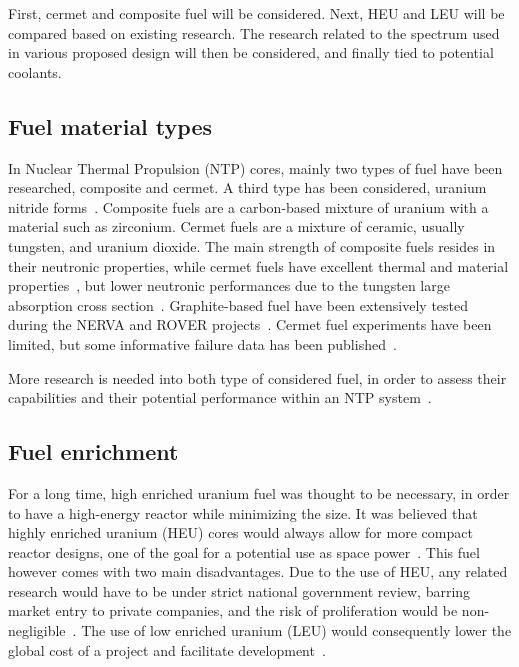 \documentclass[IJPHM, 2017, 29]{PHMSociety}
\begin{document}
First, cermet and composite fuel will be considered. Next, HEU and LEU will be compared based on existing research. The research related to the spectrum used in various proposed design will then be considered, and finally tied to potential coolants.

\subsection{Fuel material types}

In Nuclear Thermal Propulsion (NTP) cores, mainly two types of fuel have been researched, composite and cermet. A third type has been considered, uranium nitride forms~\citep{matthews1993fuels}. Composite fuels are a carbon-based mixture of uranium with a material such as zirconium. Cermet fuels are a mixture of ceramic, usually tungsten, and uranium dioxide. The main strength of composite fuels resides in their neutronic properties, while cermet fuels have excellent thermal and material properties~\citep{postoncermet}, but lower neutronic performances due to the tungsten large absorption cross section~\citep{venneridesign}. Graphite-based fuel have been extensively tested during the NERVA and ROVER projects~\citep{taub1975review,lyon1973performance}. Cermet fuel experiments have been limited, but some informative failure data has been published~\citep{stewart2013comparison}.

More research is needed into both type of considered fuel, in order to assess their capabilities and their potential performance within an NTP system~\citep{qualls2017steps}.

\subsection{Fuel enrichment}

For a long time, high enriched uranium fuel was thought to be necessary, in order to have a high-energy reactor while minimizing the size. It was believed that highly enriched uranium (HEU) cores would always allow for more compact reactor designs, one of the goal for a potential use as space power~\citep{patel2016comparing}. This fuel however comes with two main disadvantages. Due to the use of HEU, any related research would have to be under strict national government review, barring market entry to private companies, and the risk of proliferation would be non-negligible~\citep{venneri2015feasibility}. The use of low enriched uranium (LEU) would consequently lower the global cost of a project and facilitate development~\citep{houts2014safe}.
\end{document}
